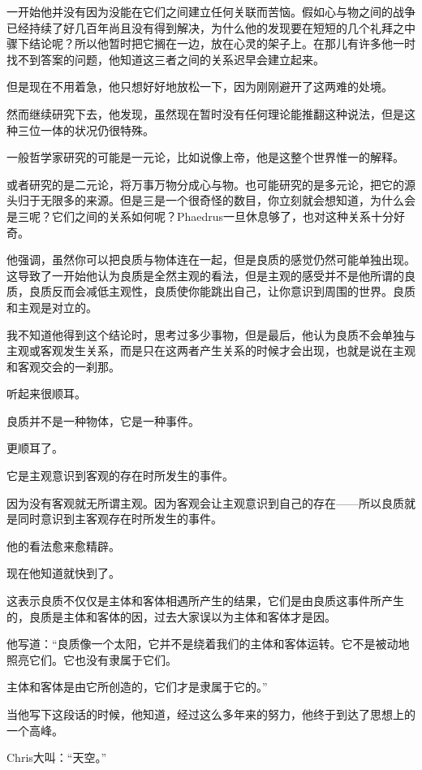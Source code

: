 \documentclass[UTF8]{article}
\begin{document}
\par 一开始他并没有因为没能在它们之间建立任何关联而苦恼。假如心与物之间的战争已经持续了好几百年尚且没有得到解决，为什么他的发现要在短短的几个礼拜之中骤下结论呢？所以他暂时把它搁在一边，放在心灵的架子上。在那儿有许多他一时找不到答案的问题，他知道这三者之间的关系迟早会建立起来。
\par 但是现在不用着急，他只想好好地放松一下，因为刚刚避开了这两难的处境。
\par 然而继续研究下去，他发现，虽然现在暂时没有任何理论能推翻这种说法，但是这种三位一体的状况仍很特殊。
\par 一般哲学家研究的可能是一元论，比如说像上帝，他是这整个世界惟一的解释。
\par 或者研究的是二元论，将万事万物分成心与物。也可能研究的是多元论，把它的源头归于无限多的来源。但是三是一个很奇怪的数目，你立刻就会想知道，为什么会是三呢？它们之间的关系如何呢？Phaedrus一旦休息够了，也对这种关系十分好奇。
\par 他强调，虽然你可以把良质与物体连在一起，但是良质的感觉仍然可能单独出现。这导致了一开始他认为良质是全然主观的看法，但是主观的感受并不是他所谓的良质，良质反而会减低主观性，良质使你能跳出自己，让你意识到周围的世界。良质和主观是对立的。
\par 我不知道他得到这个结论时，思考过多少事物，但是最后，他认为良质不会单独与主观或客观发生关系，而是只在这两者产生关系的时候才会出现，也就是说在主观和客观交会的一刹那。
\par 听起来很顺耳。
\par 良质并不是一种物体，它是一种事件。
\par 更顺耳了。
\par 它是主观意识到客观的存在时所发生的事件。
\par 因为没有客观就无所谓主观。因为客观会让主观意识到自己的存在——所以良质就是同时意识到主客观存在时所发生的事件。
\par 他的看法愈来愈精辟。
\par 现在他知道就快到了。
\par 这表示良质不仅仅是主体和客体相遇所产生的结果，它们是由良质这事件所产生的，良质是主体和客体的因，过去大家误以为主体和客体才是因。
\par 他写道：“良质像一个太阳，它并不是绕着我们的主体和客体运转。它不是被动地照亮它们。它也没有隶属于它们。
\par 主体和客体是由它所创造的，它们才是隶属于它的。”
\par 当他写下这段话的时候，他知道，经过这么多年来的努力，他终于到达了思想上的一个高峰。
\par Chris大叫：“天空。”
\end{document}
